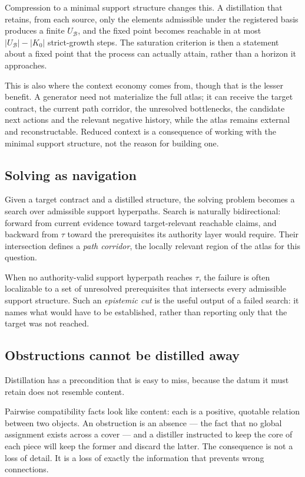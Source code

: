 Compression to a minimal support structure changes this. A distillation that retains, from each source, only the elements admissible under the registered basis produces a finite \(U_{\mathcal B}\), and the fixed point becomes reachable in at most \(|U_{\mathcal B}|-|K_0|\) strict-growth steps. The saturation criterion is then a statement about a fixed point that the process can actually attain, rather than a horizon it approaches.

This is also where the context economy comes from, though that is the lesser benefit. A generator need not materialize the full atlas; it can receive the target contract, the current path corridor, the unresolved bottlenecks, the candidate next actions and the relevant negative history, while the atlas remains external and reconstructable. Reduced context is a consequence of working with the minimal support structure, not the reason for building one.

\subsection{Solving as navigation}

Given a target contract and a distilled structure, the solving problem becomes a search over admissible support hyperpaths. Search is naturally bidirectional: forward from current evidence toward target-relevant reachable claims, and backward from \(\tau\) toward the prerequisites its authority layer would require. Their intersection defines a \emph{path corridor}, the locally relevant region of the atlas for this question.

When no authority-valid support hyperpath reaches \(\tau\), the failure is often localizable to a set of unresolved prerequisites that intersects every admissible support structure. Such an \emph{epistemic cut} is the useful output of a failed search: it names what would have to be established, rather than reporting only that the target was not reached.

\subsection{Obstructions cannot be distilled away}

Distillation has a precondition that is easy to miss, because the datum it must retain does not resemble content.

Pairwise compatibility facts look like content: each is a positive, quotable relation between two objects. An obstruction is an absence --- the fact that no global assignment exists across a cover --- and a distiller instructed to keep the core of each piece will keep the former and discard the latter. The consequence is not a loss of detail. It is a loss of exactly the information that prevents wrong connections.

